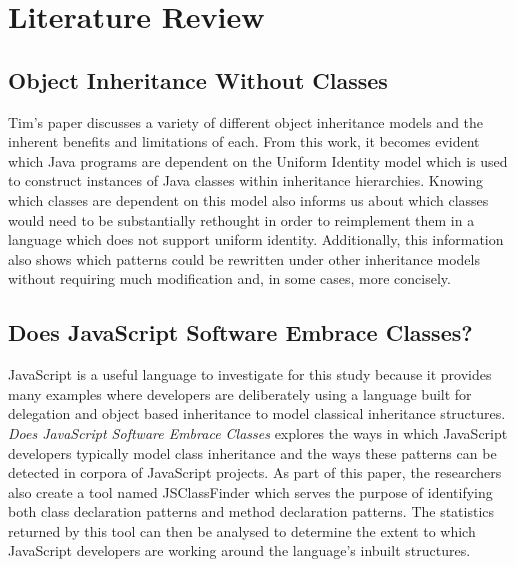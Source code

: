 \chapter{Literature Review}\label{C:us}

\section{Object Inheritance Without Classes~\cite{InheritanceWithoutClasses}}
Tim's paper discusses a variety of different object inheritance models and the inherent benefits and limitations of each. From this work, it becomes evident which Java programs are dependent on the Uniform Identity model which is used to construct instances of Java classes within inheritance hierarchies. Knowing which classes are dependent on this model also informs us about which classes would need to be substantially rethought in order to reimplement them in a language which does not support uniform identity. Additionally, this information also shows which patterns could be rewritten under other inheritance models without requiring much modification and, in some cases, more concisely.

\section{Does JavaScript Software Embrace Classes?~\cite{JSClassFinder}}
JavaScript is a useful language to investigate for this study because it provides many examples where developers are deliberately using a language built for delegation and object based inheritance to model classical inheritance structures. \textit{Does JavaScript Software Embrace Classes} explores the ways in which JavaScript developers typically model class inheritance and the ways these patterns can be detected in corpora of JavaScript projects. As part of this paper, the researchers also create a tool named JSClassFinder which serves the purpose of identifying both class declaration patterns and method declaration patterns. The statistics returned by this tool can then be analysed to determine the extent to which JavaScript developers are working around the language's inbuilt structures.

